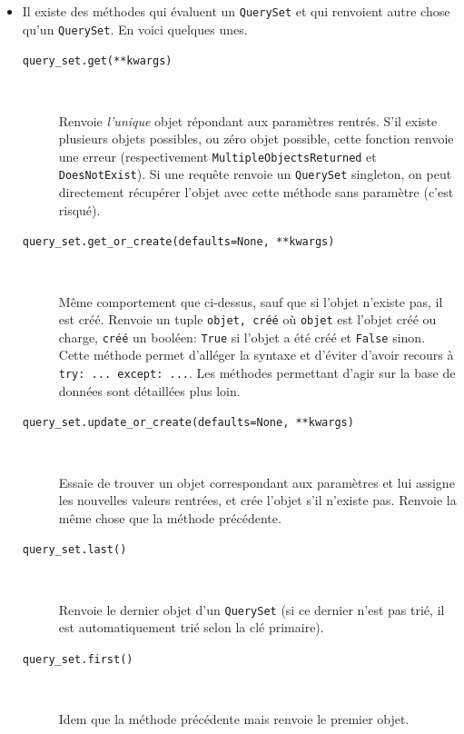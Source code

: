 \documentclass[a4paper, 10pt]{article}
\begin{document}
{\begin{itemize}
	\item Il existe des méthodes qui évaluent un \texttt{QuerySet} et qui renvoient autre chose qu'un \texttt{QuerySet}. En voici quelques unes.

	      \begin{description}
		      \item[\texttt{query_set.get(**kwargs)}]~

		            Renvoie \emph{l'unique} objet répondant aux paramètres rentrés. S'il existe plusieurs objets possibles, ou zéro objet possible, cette fonction renvoie une erreur (respectivement \texttt{MultipleObjectsReturned} et \texttt{DoesNotExist}). Si une requête renvoie un \texttt{QuerySet} singleton, on peut directement récupérer l'objet avec cette méthode sans paramètre (c'est risqué).

		      \item[\texttt{query_set.get_or_create(defaults=None, **kwargs)}]~

		            Même comportement que ci-dessus, sauf que si l'objet n'existe pas, il est créé. Renvoie un tuple \texttt{objet, créé} où \texttt{objet} est l'objet créé ou charge, \texttt{créé} un booléen: \texttt{True} si l'objet a été créé et \texttt{False} sinon. Cette méthode permet d'alléger la syntaxe et d'éviter d'avoir recours à \texttt{try: ... except: ...}. Les méthodes permettant d'agir sur la base de données sont détaillées plus loin.

		      \item[\texttt{query_set.update_or_create(defaults=None, **kwargs)}]~

		            Essaie de trouver un objet correspondant aux paramètres et lui assigne les nouvelles valeurs rentrées, et crée l'objet s'il n'existe pas. Renvoie la même chose que la méthode précédente.

		      \item[\texttt{query_set.last()}]~

		            Renvoie le dernier objet d'un \texttt{QuerySet} (si ce dernier n'est pas trié, il est automatiquement trié selon la clé primaire).

		      \item[\texttt{query_set.first()}]~

		            Idem que la méthode précédente mais renvoie le premier objet.


\end{description}
\end{itemize}}
\end{document}
